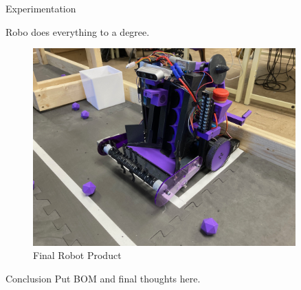 \documentclass[final]{beamer}
\newlength{\sepwidth}
\newlength{\colwidth}
\newcommand{\separatorcolumn}{\begin{column}{\sepwidth}\end{column}}
\begin{document}
\begin{frame}[t]
\begin{columns}[t]
\begin{column}{\colwidth}
\end{column}

\separatorcolumn

\begin{column}{\colwidth}

    \begin{block}{Experimentation}

    Robo does everything to a degree.

  \end{block}

  \begin{figure}
      \centering
      \includegraphics[width=20.0cm]{Robot_Practice_Field.jpg}
      \caption{Final Robot Product}
    \end{figure}

  \begin{block}{Conclusion}
    Put BOM and final thoughts here.





\end{block}
\end{column}
\end{columns}
\end{frame}
\end{document}
